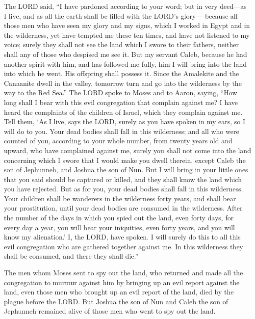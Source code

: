  The LORD said, ``I have pardoned according to your word;
 but in very deed---as I live, and as all the earth shall
be filled with the LORD's glory---  because all those men
who have seen my glory and my signs, which I worked in Egypt and in the
wilderness, yet have tempted me these ten times, and have not listened
to my voice;  surely they shall not see the land which I
swore to their fathers, neither shall any of those who despised me see
it.  But my servant Caleb, because he had another spirit
with him, and has followed me fully, him I will bring into the land into
which he went. His offspring shall possess it.  Since the
Amalekite and the Canaanite dwell in the valley, tomorrow turn and go
into the wilderness by the way to the Red Sea.''  The
LORD spoke to Moses and to Aaron, saying,  ``How long
shall I bear with this evil congregation that complain against me? I
have heard the complaints of the children of Israel, which they complain
against me.  Tell them, `As I live, says the LORD, surely
as you have spoken in my ears, so I will do to you.  Your
dead bodies shall fall in this wilderness; and all who were counted of
you, according to your whole number, from twenty years old and upward,
who have complained against me,  surely you shall not
come into the land concerning which I swore that I would make you dwell
therein, except Caleb the son of Jephunneh, and Joshua the son of Nun.
 But I will bring in your little ones that you said
should be captured or killed, and they shall know the land which you
have rejected.  But as for you, your dead bodies shall
fall in this wilderness.  Your children shall be
wanderers in the wilderness forty years, and shall bear your
prostitution, until your dead bodies are consumed in the wilderness.
 After the number of the days in which you spied out the
land, even forty days, for every day a year, you will bear your
iniquities, even forty years, and you will know my alienation.'
 I, the LORD, have spoken. I will surely do this to all
this evil congregation who are gathered together against me. In this
wilderness they shall be consumed, and there they shall die.''

 The men whom Moses sent to spy out the land, who
returned and made all the congregation to murmur against him by bringing
up an evil report against the land,  even those men who
brought up an evil report of the land, died by the plague before the
LORD.  But Joshua the son of Nun and Caleb the son of
Jephunneh remained alive of those men who went to spy out the land.

